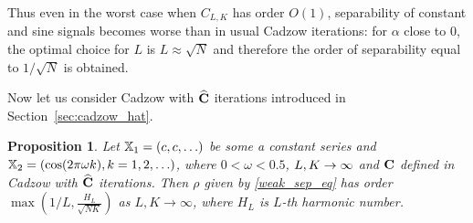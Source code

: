 \documentclass[sii]{ipart}
\newtheorem{proposition}{Proposition}
\begin{document}
Thus even in the worst case when $C_{L,K}$ has order $O(1)$, separability of constant and sine signals becomes worse than in usual Cadzow iterations: for $\alpha$ close to 0, the optimal choice for $L$ is $L \approx \sqrt{N}$ and therefore the order of separability equal to $1/\sqrt{N}$ is obtained.

Now let us consider Cadzow with $\widehat{\mathbf{C}}$ iterations introduced in Section~\ref{sec:cadzow_hat}.

\begin{proposition}
	\label{prop:separ2}
	Let $\mathbb{X}_1 = (c, c, \ldots)$ be some a constant series and $\mathbb{X}_2 = (\cos(2 \pi \omega k), k = 1, 2, \ldots)$, where $0<\omega <0.5$, $L,K\rightarrow \infty$ and $\mathbf{C}$ defined in Cadzow with $\widehat{\mathbf{C}}$ iterations.
	Then $\rho$ given by \eqref{weak_sep_eq} has order $\max \left(1/L, \frac{H_L}{\sqrt{NK}} \right)$ as $L, K \to \infty$, where $H_L$ is $L$-th harmonic number.
\end{proposition}
\end{document}
